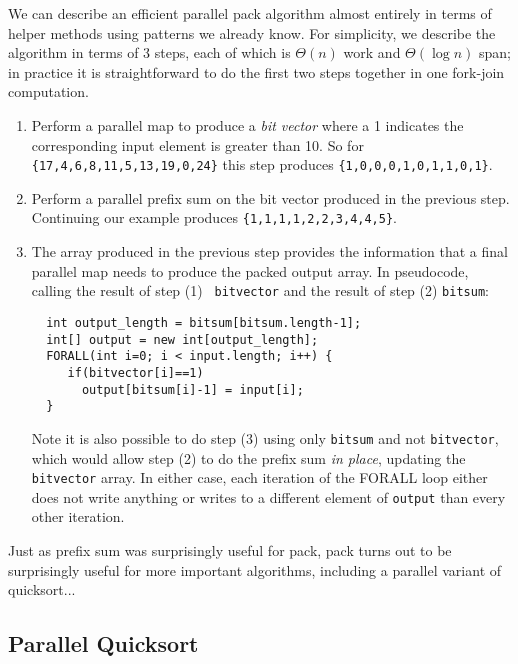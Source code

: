 \documentclass[10pt]{article}
\begin{document}
We can describe an efficient parallel pack algorithm almost entirely
in terms of helper methods using patterns we already know.  For
simplicity, we describe the algorithm in terms of 3 steps, each of
which is $\Theta(n)$ work and $\Theta(\log n)$ span; in practice it is
straightforward to do the first two steps together in one fork-join
computation.
\begin{enumerate}
\item Perform a parallel map to produce a \emph{bit vector} where a 1
  indicates the corresponding input element is greater than 10.  So
  for {\tt \{17,4,6,8,11,5,13,19,0,24\}} this step produces
  {\tt \{1,0,0,0,1,0,1,1,0,1\}}.
\item Perform a parallel prefix sum on the bit vector produced in the
  previous step.  Continuing our example produces
  {\tt \{1,1,1,1,2,2,3,4,4,5\}}.
\item The array produced in the previous step provides the information
  that a final parallel map needs to produce the packed output
  array.  In pseudocode, calling the result of step (1) {\tt
  bitvector} and the result of step (2) {\tt bitsum}:
\begin{verbatim}
  int output_length = bitsum[bitsum.length-1];
  int[] output = new int[output_length];
  FORALL(int i=0; i < input.length; i++) {
     if(bitvector[i]==1)
       output[bitsum[i]-1] = input[i];
  }
\end{verbatim}
Note it is also possible to do step (3) using only {\tt bitsum} and
not {\tt bitvector}, which would allow step (2) to do the prefix sum
\emph{in place}, updating the {\tt bitvector} array.  In either case,
each iteration of the FORALL loop either does not write anything or
writes to a different element of {\tt output} than every other
iteration.
\end{enumerate}

Just as prefix sum was surprisingly useful for pack, pack turns out to
be surprisingly useful for more important algorithms, including a
parallel variant of quicksort...

\subsection{Parallel Quicksort}
\end{document}
